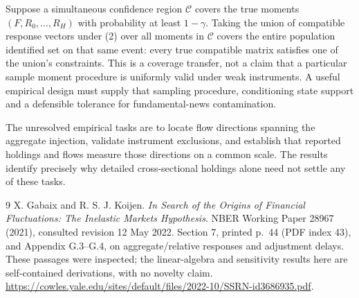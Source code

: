 \documentclass[11pt]{article}
\theoremstyle{remark}
\begin{document}
Suppose a simultaneous confidence region $\mathcal C$ covers the true
moments $(F,R_0,\ldots,R_H)$ with probability at least $1-\gamma$.
Taking the union of compatible response vectors under (2) over all
moments in $\mathcal C$ covers the entire population identified set on
that same event: every true compatible matrix satisfies one of the union's
constraints. This is a coverage transfer, not a claim that a particular
sample moment procedure is uniformly valid under weak instruments.
A useful empirical design must supply that sampling procedure, conditioning
state support and a defensible tolerance for fundamental-news contamination.

The unresolved empirical tasks are to locate flow directions spanning the
aggregate injection, validate instrument exclusions, and establish that
reported holdings and flows measure those directions on a common scale.
The results identify precisely why detailed cross-sectional holdings alone
need not settle any of these tasks.

\begin{thebibliography}{9}
 X. Gabaix and R. S. J. Koijen.
\emph{In Search of the Origins of Financial Fluctuations: The Inelastic
Markets Hypothesis}. NBER Working Paper 28967 (2021), consulted revision
12 May 2022. Section 7, printed p.~44 (PDF index 43), and Appendix G.3--G.4,
on aggregate/relative responses and adjustment delays. These passages
were inspected; the linear-algebra and sensitivity results here are
self-contained derivations, with no novelty claim.
\url{https://cowles.yale.edu/sites/default/files/2022-10/SSRN-id3686935.pdf}.
\end{thebibliography}
\end{document}
